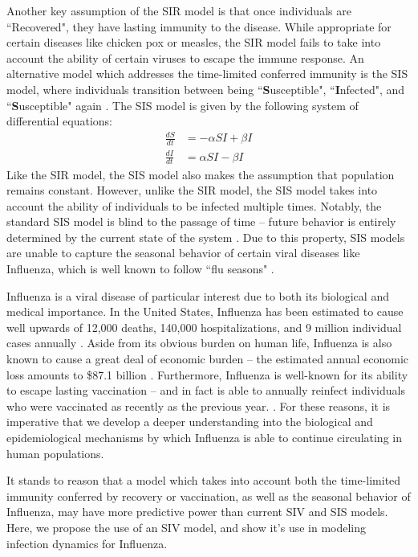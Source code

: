 \documentclass[12pt]{article}
\begin{document}
Another key assumption of the SIR model is that once individuals are ``Recovered", they have lasting immunity to the disease. While appropriate for certain diseases like chicken pox or measles, the SIR model fails to take into account the ability of certain viruses to escape the immune response. An alternative model which addresses the time-limited conferred immunity is the SIS model, where individuals transition between being ``\textbf{S}usceptible", ``\textbf{I}nfected", and ``\textbf{S}usceptible" again \citep{doi:10.1093/bmb/ldp038}. The SIS model is given by the following system of differential equations:
\begin{equation}
\begin{aligned}
\frac{dS}{dt} &= -\alpha S I + \beta I \\
\frac{dI}{dt} &= \alpha S I - \beta I
\end{aligned}
\end{equation}
Like the SIR model, the SIS model also makes the assumption that population remains constant. However, unlike the SIR model, the SIS model takes into account the ability of individuals to be infected multiple times. Notably, the standard SIS model is blind to the passage of time -- future behavior is entirely determined by the current state of the system \citep{1742-5468-2012-05-P05012}. Due to this property, SIS models are unable to capture the seasonal behavior of certain viral diseases like Influenza, which is well known to follow ``flu seasons" \citep{Bedford191676}.

Influenza is a viral disease of particular interest due to both its biological and medical importance. In the United States, Influenza has been estimated to cause well upwards of 12,000 deaths, 140,000 hospitalizations, and 9 million individual cases annually \citep{rolfes2016estimated}. Aside from its obvious burden on human life, Influenza is also known to cause a great deal of economic burden -- the estimated annual economic loss amounts to \$87.1 billion \citep{molinari2007annual}. Furthermore, Influenza is well-known for its ability to escape lasting vaccination -- and in fact is able to annually reinfect individuals who were vaccinated as recently as the previous year. \citep{Bedford191676}. For these reasons, it is imperative that we develop a deeper understanding into the biological and epidemiological mechanisms by which Influenza is able to continue circulating in human populations.

It stands to reason that a model which takes into account both the time-limited immunity conferred by recovery or vaccination, as well as the seasonal behavior of Influenza, may have more predictive power than current SIV and SIS models. Here, we propose the use of an SIV model, and show it's use in modeling infection dynamics for Influenza.
\end{document}
